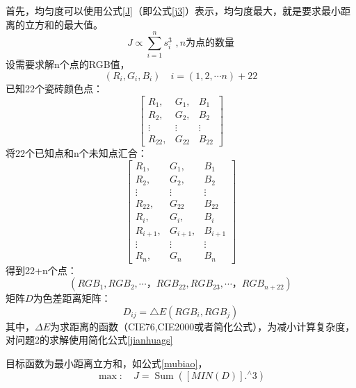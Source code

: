 \documentclass{article}
\begin{document}
 首先，均匀度可以使用公式\eqref{J}（即公式\eqref{j3}）表示，均匀度最大，就是要求最小距离的立方和的最大值。
  \begin{equation}
 J \propto  \sum_{i=1}^{n} s_{i}^{3}\,\, ,n\text{为点的数量}
 \label{J}
 \end{equation}
  设需要求解n个点的RGB值，
  \begin{equation}
  \left(R_{i}, G_{i}, B_{i}\right) \quad i=(1,2, \cdots n)+22
  \end{equation}
  已知22个瓷砖颜色点：
  \begin{equation}
  \left[\begin{array}{ccc}
  R_{1}, & G_{1}, & B_{1} \\
  R_{2}, & G_{2},& B_{2} \\
  \vdots & \vdots & \vdots \\
  R_{22}, & G_{22} & B_{22}
  \end{array}\right]
  \end{equation}
  将22个已知点和n个未知点汇合：
   \begin{equation}
  \left[\begin{array}{ccc}
  R_{1}, & G_{1}, & B_{1} \\
  R_{2}, & G_{2},& B_{2} \\
  \vdots & \vdots & \vdots \\
  R_{22}, & G_{22} & B_{22}\\
    R_{i}, & G_{i}, & B_{i} \\
  R_{i+1}, & G_{i+1},& B_{i+1} \\
  \vdots & \vdots & \vdots \\
  R_{n}, & G_{n} & B_{n}
  \end{array}\right]
  \end{equation}
  得到22+n个点：
  \begin{equation}
  \left(R G B_{1}, R G B_{2}, \cdots， R G B_{22}, R G B_{23},\cdots， R G B_{n+22}\right)
  \end{equation}
  矩阵$D$为色差距离矩阵：
  \begin{equation}
  D_{i j}=\triangle E\left(R G B_{i}, R G B_{j}\right)
  \end{equation}
  其中，$\Delta E$为求距离的函数（CIE76,CIE2000或者简化公式），为减小计算复杂度，对问题2的求解使用简化公式\eqref{jianhuags}
  
  目标函数为最小距离立方和，如公式\eqref{mubiao}，
  \begin{equation}
  \max : \quad J = \operatorname{Sum}\left([MIN(D)].^{\wedge} 3\right)
  \label{mubiao}
  \end{equation}
  
\end{document}
